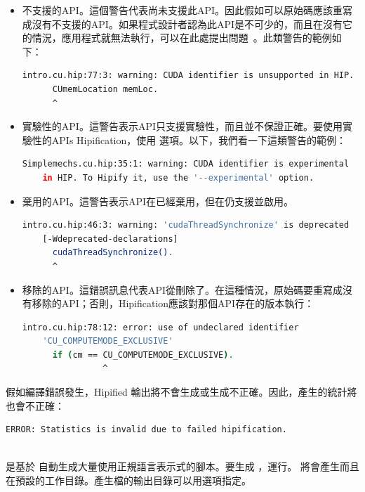 \begin{itemize}
    \item 不支援的API。這個警告代表尚未支援此API。因此假如可以原始碼應該重寫成沒有不支援的API。如果程式設計者認為此API是不可少的，而且在沒有它的情況，應用程式就無法執行，可以在此處提出問題~\cite{HIP}。此類警告的範例如下：

    \begin{lstlisting}[language=bash]
    intro.cu.hip:77:3: warning: CUDA identifier is unsupported in HIP.
      CUmemLocation memLoc.
      ^
    \end{lstlisting}
    
    \item 實驗性的API。這警告表示API只支援實驗性，而且並不保證正確。要使用實驗性的APIs Hipification，使用  選項。以下，我們看一下這類警告的範例：
    
    \begin{lstlisting}[language=bash]
    Simplemechs.cu.hip:35:1: warning: CUDA identifier is experimental
    in HIP. To Hipify it, use the '--experimental' option.
    \end{lstlisting}
    
    \item 棄用的API。這警告表示API在已經棄用，但在仍支援並啟用。
    
    \begin{lstlisting}[language=bash]
    intro.cu.hip:46:3: warning: 'cudaThreadSynchronize' is deprecated
    [-Wdeprecated-declarations]
      cudaThreadSynchronize().
      ^
    \end{lstlisting}
    
    \item 移除的API。這錯誤訊息代表API從刪除了。在這種情況，原始碼要重寫成沒有移除的API；否則，Hipification應該對那個API存在的版本執行：
    
    \begin{lstlisting}[language=bash]
    intro.cu.hip:78:12: error: use of undeclared identifier
    'CU_COMPUTEMODE_EXCLUSIVE'
      if (cm == CU_COMPUTEMODE_EXCLUSIVE).
                ^
    \end{lstlisting}


\end{itemize}

假如編譯錯誤發生，Hipified 輸出將不會生成或生成不正確。因此，產生的統計將也會不正確：

\begin{lstlisting}[language=bash]
ERROR: Statistics is invalid due to failed hipification.
\end{lstlisting} 
\\  是基於  自動生成大量使用正規語言表示式的腳本。要生成 ，運行。 將會產生而且在預設的工作目錄。產生檔的輸出目錄可以用選項指定。

